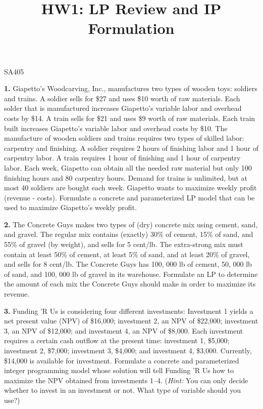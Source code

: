 \documentclass[11pt]{article}
\makeatletter
\theoremstyle{definition}
\renewcommand{\maketitle}{
  \noindent SA405 

  \begin{center}\Large{\textbf{\@title}}\end{center}
}
\makeatother
\begin{document}
\title{HW1: LP Review and IP Formulation}


\maketitle

\textbf{1.} Giapetto’s Woodcarving, Inc., manufactures two types of wooden toys: soldiers and trains. A soldier sells for \$27 and uses \$10 worth of raw materials. Each solder that is manufactured increases Giapetto’s variable labor and overhead costs by \$14. A train sells for \$21 and uses \$9 worth of raw materials. Each train built increases Giapetto’s variable labor and overhead costs by \$10. The manufacture of wooden soldiers and trains requires two types of skilled labor: carpentry and finishing. A soldier requires 2 hours of finishing labor and 1 hour of carpentry labor. A train requires 1 hour of finishing and 1 hour of carpentry labor. Each week, Giapetto can obtain all the needed raw material but only 100 finishing hours and 80 carpentry hours. Demand for trains is unlimited, but at most 40 soldiers are bought each week. Giapetto wants to maximize weekly profit (revenue - costs). Formulate a concrete and parameterized LP model that can be used to maximize Giapetto’s weekly profit.

\vspace{1in}

\textbf{2.} The Concrete Guys makes two types of (dry) concrete mix using cement, sand, and gravel. The regular mix contains (exactly) 30\% of cement, 15\% of sand, and 55\% of gravel (by weight), and sells for 5 cent/lb. The extra-strong mix must contain at least 50\% of cement, at least 5\% of sand, and at least 20\% of gravel, and sells for 8 cent/lb. The Concrete Guys has 100, 000 lb of cement, 50, 000 lb of sand, and 100, 000 lb of gravel in its warehouse. Formulate an LP to determine the amount of each mix the Concrete Guys should make in order to maximize its revenue.

\vspace{1in}

\textbf{3.} Funding 'R Us is considering four different investments: Investment 1 yields a net present value (NPV) of \$16,000; investment 2, an NPV of \$22,000; investment 3, an NPV of \$12,000; and investment 4, an NPV of \$8,000. Each investment requires a certain cash outflow at the present time: investment 1, \$5,000; investment 2, \$7,000; investment 3, \$4,000; and investment 4, \$3,000. Currently, \$14,000 is available for investment. Formulate a concrete and parameterized integer programming model whose solution will tell Funding 'R Us how to maximize the NPV obtained from investments 1--4. (\emph{Hint:} You can only decide whether to invest in an investment or not. What type of variable should you use?)  
\end{document}
